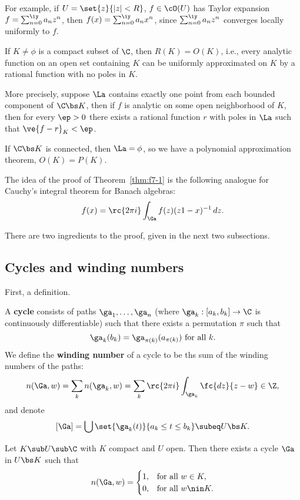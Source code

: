 For example, if $U=\set{z}{|z|<R}$, $f\in \cO(U)$ has Taylor expansion $f=\sum_{n=0}^{\iy} a_nz^n$, then $f(x)=\sum_{n=0}^{\iy} a_nx^n$, since $\sum_{n=0}^{\iy} a_nz^n$ converges locally uniformly to $f$.
\begin{thm}
If $K\ne \phi$ is a compact subset of $\C$, then  $R(K)=O(K)$, i.e., every analytic function on an open set containing $K$ can be uniformly approximated on $K$ by a rational function with no poles in $K$.

More precisely, suppose $\La$ contains exactly one point from each bounded component of $\C\bs K$, then if $f$ is analytic on some open neighborhood of $K$, then for every $\ep>0$ there exists a rational function $r$ with poles in $\La$ such that $\ve{f-r}_K<\ep$.
\end{thm}
\begin{rem}
If $\C\bs K$ is connected, then $\La=\phi$, so we have a polynomial approximation theorem, $O(K)=P(K)$.
\end{rem}
The idea of the proof of Theorem~\ref{thm:f7-1} is the following analogue for Cauchy's integral theorem for Banach algebras: 
\[
f(x)=\rc{2\pi i}\int_{\Ga} f(z)(z1-x)^{-1}\,dz.
\]

There are two ingredients to the proof, given in the next two subsections. 
\subsection{Cycles and winding numbers}
First, a definition.
\begin{df}
A \textbf{cycle} consists of paths $\ga_1,\ldots, \ga_n$ (where $\ga_k:[a_k,b_k]\to \C$ is continuously differentiable) such that there exists a permutation $\pi$ such that
\[
\ga_k(b_k)=\ga_{\pi(k)}(a_{\pi(k)})\text{ for all }k.
\]
We define the \textbf{winding number} of a cycle to be ths sum of the winding numbers of the paths:
\[
n(\Ga,w)=\sum_k n(\ga_k,w)=\sum_k \rc{2\pi i}\int_{\ga_k} \fc{dz}{z-w}\in \Z,\] and denote
\[[\Ga]=\bigcup\set{\ga_k(t)}{a_k\le t\le b_k}\subeq U\bs K.\]
\end{df}

Let $K\sub U\sub \C$ with $K$ compact and $U$ open. Then there exists a cycle $\Ga$ in $U\bs K$ such that 
\[
n(\Ga,w)=\begin{cases}
1,&\text{for all }w\in K,\\
0,&\text{for all }w\nin K.
\end{cases}
\]

